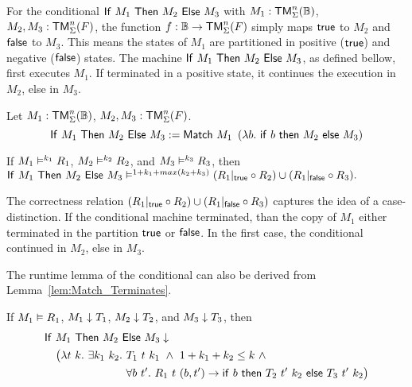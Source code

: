 For the conditional $\mathsf{If}~M_1~\mathsf{Then}~M_2~\mathsf{Else}~M_3$ with $M_1 : \mathsf{TM}_\Sigma^n(\mathbb{B})$, $M_2, M_3 : \mathsf{TM}_\Sigma^n(F)$, the function
$f : \mathbb{B} \rightarrow \mathsf{TM}_\Sigma^n(F)$ simply maps $\mathsf{true}$ to $M_2$ and $\mathsf{false}$ to $M_3$.  This means the states of $M_1$ are partitioned in positive
($\mathsf{true}$) and negative ($\mathsf{false}$) states.  The machine $\mathsf{If}~M_1~\mathsf{Then}~M_2~\mathsf{Else}~M_3$, as defined bellow, first executes $M_1$.  If terminated in a positive
state, it continues the execution in $M_2$, else in $M_3$.

%
\begin{definition}[Conditional][If]
  \label{def:If}
  Let $M_1 : \mathsf{TM}_\Sigma^n(\mathbb{B})$, $M_2, M_3 : \mathsf{TM}_\Sigma^n(F)$.
  \[
    \mathsf{If}~M_1~\mathsf{Then}~M_2~\mathsf{Else}~M_3 := \mathsf{Match}~M_1~
    \left(\lambda b.~\mathsf{if}~b~\mathsf{then}~M_2~\mathsf{else}~M_3 \right)
  \]
\end{definition}

\begin{lemma}
  \label{lem:If_RealiseIn}
  If $M_1 \mathrel{\vDash^{k_1}} R_1$, $M_2 \mathrel{\vDash^{k_2}} R_2$, and $M_3 \mathrel{\vDash^{k_3}} R_3$, then
  $
    \mathsf{If}~M_1~\mathsf{Then}~M_2~\mathsf{Else}~M_3 \mathrel{\vDash^{1+k_1+max(k_2+k_3)}} (R_1{|}_{\mathsf{true}} \circ R_2) \cup (R_1{|}_{\mathsf{false}} \circ R_3).
  $
\end{lemma}

The correctness relation $(R_1{|}_{\mathsf{true}} \circ R_2) \cup (R_1{|}_{\mathsf{false}} \circ R_3)$ captures the idea of a case-distinction.  If the conditional machine
terminated, than the copy of $M_1$ either terminated in the partition $\mathsf{true}$ or $\mathsf{false}$.  In the first case, the conditional continued in $M_2$,
else in $M_3$.

The runtime lemma of the conditional can also be derived from Lemma~\ref{lem:Match_Terminates}.
\begin{lemma}
  \label{lem:If_TerminatesIn}
  If $M_1 \mathrel{\vDash} R_1$, $M_1 \mathrel{\downarrow} T_1$, $M_2 \mathrel{\downarrow} T_2$, and $M_3 \mathrel{\downarrow} T_3$, then
  \begin{align*}
    & \mathsf{If}~M_1~\mathsf{Then}~M_2~\mathsf{Else}~M_3 \mathrel{\downarrow} \\
    &\quad \bigl( \lambda t~k.~\exists k_1~k_2.~T_1~t~k_1 ~\land~ 1+k_1+k_2 \leq k ~\land~ \\
    &\quad \phantom{\bigl( \lambda t~k.~\exists k_1~k_2.}~\forall b~t'.~R_1~t~(b, t') \rightarrow \mathsf{if}~b~\mathsf{then}~T_2~t'~k_2~\mathsf{else}~T_3~t'~k_2 \bigr)
  \end{align*}
\end{lemma}


